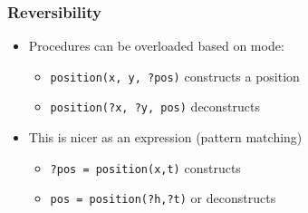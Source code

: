 \documentclass[12pt]{beamer}
\begin{document}
\begin{frame}[fragile]
\frametitle{Reversibility}
\begin{itemize}
\item Procedures can be overloaded based on mode:
  \begin{itemize}
    \item \texttt{position(x, y, ?pos)}  constructs a position
    \item \texttt{position(?x, ?y, pos)}  deconstructs
  \end{itemize}
\item This is nicer as an expression (pattern matching)
  \begin{itemize}
  \item  \texttt{?pos = position(x,t)} constructs
  \item  \texttt{pos = position(?h,?t)} or deconstructs
  \end{itemize}
\end{itemize}
\end{frame}
\end{document}
